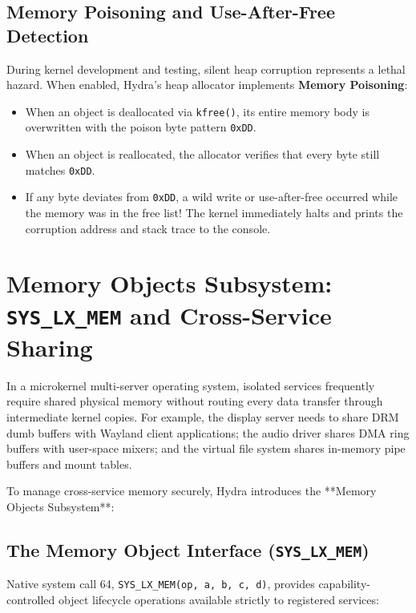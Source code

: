 \subsection{Memory Poisoning and Use-After-Free Detection}

During kernel development and testing, silent heap corruption represents a lethal hazard. When enabled, Hydra's heap allocator implements \textbf{Memory Poisoning}:
\begin{itemize}
    \item When an object is deallocated via \texttt{kfree()}, its entire memory body is overwritten with the poison byte pattern \texttt{0xDD}.
    \item When an object is reallocated, the allocator verifies that every byte still matches \texttt{0xDD}.
    \item If any byte deviates from \texttt{0xDD}, a wild write or use-after-free occurred while the memory was in the free list! The kernel immediately halts and prints the corruption address and stack trace to the console.
\end{itemize}

\section{Memory Objects Subsystem: \texttt{SYS\_LX\_MEM} and Cross-Service Sharing}
\label{sec:memory_objects_subsystem}

In a microkernel multi-server operating system, isolated services frequently require shared physical memory without routing every data transfer through intermediate kernel copies. For example, the display server needs to share DRM dumb buffers with Wayland client applications; the audio driver shares DMA ring buffers with user-space mixers; and the virtual file system shares in-memory pipe buffers and mount tables.

To manage cross-service memory securely, Hydra introduces the **Memory Objects Subsystem**:

\subsection{The Memory Object Interface (\texttt{SYS\_LX\_MEM})}
Native system call 64, \texttt{SYS\_LX\_MEM(op, a, b, c, d)}, provides capability-controlled object lifecycle operations available strictly to registered services:

